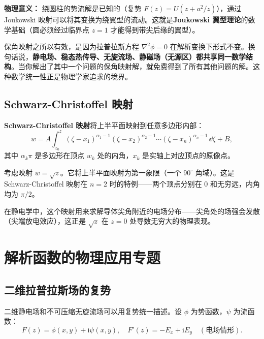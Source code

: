 \textbf{物理意义：} 绕圆柱的势流解是已知的（复势 $F(z) = U(z + a^2/z)$），通过 Joukowski 映射可以将其变换为绕翼型的流动。这就是\textbf{Joukowski 翼型理论}的数学基础（圆必须经过临界点 $z=1$ 才能得到带尖后缘的翼型）。

\begin{insight}[保角映射的物理哲学]
保角映射之所以有效，是因为拉普拉斯方程 $\nabla^2\phi=0$ 在解析变换下形式不变。换句话说，\textbf{静电场、稳态热传导、无旋流场、静磁场（无源区）都共享同一数学结构}。当你解出了其中一个问题的保角映射解，就免费得到了所有其他问题的解。这种数学统一性正是物理学家追求的境界。
\end{insight}

\subsection{Schwarz-Christoffel 映射}

\textbf{Schwarz-Christoffel 映射}将上半平面映射到任意多边形内部：
\begin{equation}
w = A\int_{z_0}^{z} (\zeta - x_1)^{\alpha_1-1}(\zeta - x_2)^{\alpha_2-1}\cdots(\zeta - x_n)^{\alpha_n-1}\,\dd\zeta + B,
\label{eq:sc_mapping}
\end{equation}
其中 $\alpha_k\pi$ 是多边形在顶点 $w_k$ 处的内角，$x_k$ 是实轴上对应顶点的原像点。

\begin{example}[直角区域的映射]
考虑映射 $w = \sqrt{z}$。它将上半平面映射为第一象限（一个 $90^\circ$ 角域）。这是 Schwarz-Christoffel 映射在 $n=2$ 时的特例——两个顶点分别在 $0$ 和无穷远，内角均为 $\pi/2$。

在静电学中，这个映射用来求解导体尖角附近的电场分布——尖角处的场强会发散（尖端放电效应），这正是 $\sqrt{z}$ 在 $z=0$ 处导数无穷大的物理表现。
\end{example}

\section{解析函数的物理应用专题}
\label{sec:physics_applications}

\subsection{二维拉普拉斯场的复势}

二维静电场和不可压缩无旋流场可以用复势统一描述。设 $\phi$ 为势函数，$\psi$ 为流函数：
\begin{equation}
F(z) = \phi(x,y) + \mathrm{i}\psi(x,y),\quad
F'(z) = -E_x + \mathrm{i}E_y \quad(\text{电场情形}).
\end{equation}

